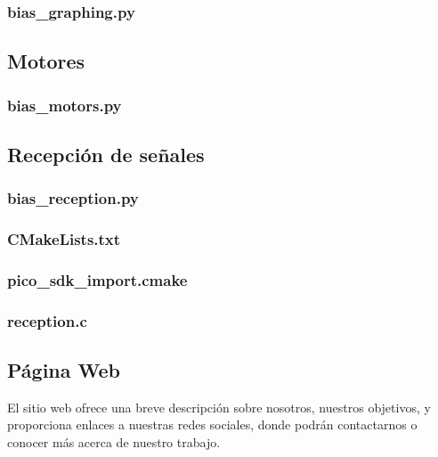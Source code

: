 \documentclass{article}
\begin{document}
\subsubsection{bias\_graphing.py} 


\subsection{Motores}

\subsubsection{bias\_motors.py}


\subsection{Recepción de señales}

\subsubsection{bias\_reception.py}



\subsubsection{CMakeLists.txt}


\subsubsection{pico\_sdk\_import.cmake}


\subsubsection{reception.c}


\subsection{Página Web}
El sitio web ofrece una breve descripción sobre nosotros, nuestros objetivos, y proporciona enlaces a nuestras redes sociales, donde podrán contactarnos o conocer más acerca de nuestro trabajo.
\end{document}
